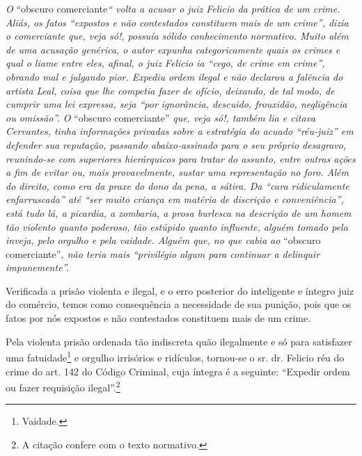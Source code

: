\begin{didascalia}
\emph{O} ``obscuro comerciante\emph{`` volta a acusar o juiz Felicio da
prática de um crime. Aliás, os fatos ``expostos e não contestados
constituem mais de um crime'', dizia o comerciante que, veja só!, possuía
sólido conhecimento normativo. Muito além de uma acusação genérica, o
autor expunha categoricamente quais os crimes e qual o liame entre eles,
afinal, o juiz Felicio ia ``cego, de crime em crime'', obrando mal e
julgando pior. Expediu ordem ilegal e não declarou a falência do artista
Leal, coisa que lhe competia fazer de ofício, deixando, de tal modo, de
cumprir uma lei expressa, seja ``por ignorância, descuido, frouxidão,
negligência ou omissão''. O} ``obscuro comerciante'' \emph{que, veja só!,
também lia e citava Cervantes, tinha informações privadas sobre a
estratégia do acuado ``réu-juiz'' em defender sua reputação, passando
abaixo-assinado para o seu próprio desagravo, reunindo-se com superiores
hierárquicos para tratar do assunto, entre outras ações a fim de evitar
ou, mais provavelmente, sustar uma representação no foro. Além do
direito, como era da praxe do dono da pena, a sátira. Da ``cara
ridiculamente enfarruscada'' até ``ser muito criança em matéria de
discrição e conveniência'', está tudo lá, a picardia, a zombaria, a prosa
burlesca na descrição de um homem tão violento quanto poderoso, tão
estúpido quanto influente, alguém tomado pela inveja, pelo orgulho e
pela vaidade. Alguém que, no que cabia ao} ``obscuro comerciante''\emph{,
não teria mais ``privilégio algum para continuar a delinquir
impunemente''.}
\end{didascalia}

Verificada a prisão violenta e ilegal, e o erro posterior do inteligente
e íntegro juiz do comércio, temos como consequência a necessidade de sua
punição, pois que os fatos por nós expostos e não contestados constituem
mais de um crime.

Pela violenta prisão ordenada tão indiscreta quão ilegalmente e só para
satisfazer uma fatuidade\footnote{ Vaidade.} e orgulho irrisórios e
ridículos, tornou-se o sr. dr. Felicio réu do crime do art. 142 do
Código Criminal, cuja íntegra é a seguinte: ``Expedir ordem ou fazer
requisição ilegal''.\footnote{ A citação confere com o texto normativo.}


